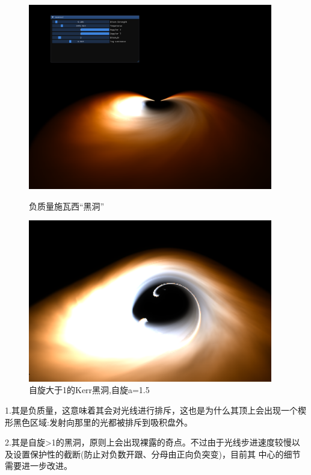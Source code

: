 \documentclass[a4paper, 12pt]{article}
\begin{document}
    \begin{figure}[H]
        \centering
        \begin{minipage}[t]{0.48\textwidth}
            \centering
            \includegraphics[width=0.95\textwidth]{photo/ip0.png}
            \caption{负质量施瓦西“黑洞”}
        \end{minipage}
        \hfill
        \begin{minipage}[t]{0.48\textwidth}
            \centering
            \includegraphics[width=0.95\textwidth]{photo/ip1.png}
            \caption{自旋大于1的Kerr黑洞,自旋a=1.5}
        \end{minipage}
    \end{figure}
    1.其是负质量，这意味着其会对光线进行排斥，这也是为什么其顶上会出现一个楔形黑色区域:发射向那里的光都被排斥到吸积盘外。\par
    2.其是自旋>1的黑洞，原则上会出现裸露的奇点。不过由于光线步进速度较慢以及设置保护性的截断(防止对负数开跟、分母由正向负突变)，目前其
    中心的细节需要进一步改进。
\end{document}
